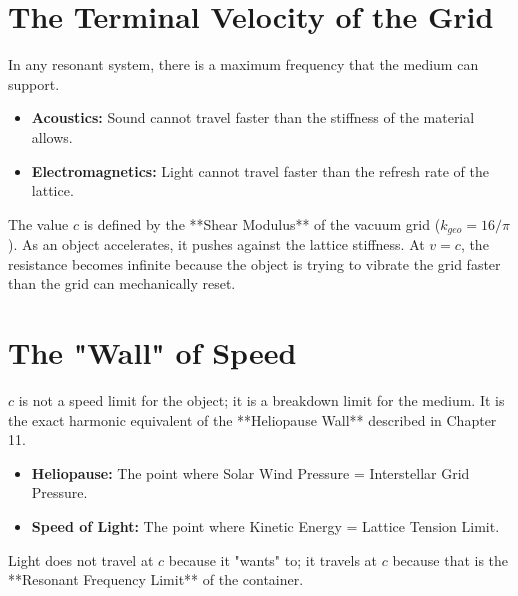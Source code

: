 \documentclass[11pt, letterpaper, openany]{book}
\begin{document}
\section{The Terminal Velocity of the Grid}
In any resonant system, there is a maximum frequency that the medium can support.
\begin{itemize}
    \item \textbf{Acoustics:} Sound cannot travel faster than the stiffness of the material allows.
    \item \textbf{Electromagnetics:} Light cannot travel faster than the refresh rate of the lattice.
\end{itemize}
The value $c$ is defined by the **Shear Modulus** of the vacuum grid ($k_{geo} = 16/\pi$).
As an object accelerates, it pushes against the lattice stiffness. At $v = c$, the resistance becomes infinite because the object is trying to vibrate the grid faster than the grid can mechanically reset.

\section{The "Wall" of Speed}
$c$ is not a speed limit for the object; it is a breakdown limit for the medium.
It is the exact harmonic equivalent of the **Heliopause Wall** described in Chapter 11.
\begin{itemize}
    \item \textbf{Heliopause:} The point where Solar Wind Pressure = Interstellar Grid Pressure.
    \item \textbf{Speed of Light:} The point where Kinetic Energy = Lattice Tension Limit.
\end{itemize}
Light does not travel at $c$ because it "wants" to; it travels at $c$ because that is the **Resonant Frequency Limit** of the container.
\end{document}
